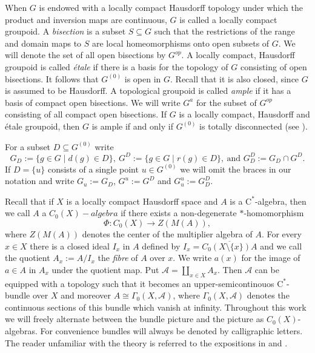 \documentclass[reqno,oneside,a4paper,11pt]{amsart}
\theoremstyle{theorem}
\theoremstyle{definition}
\begin{document}
	When $G$ is endowed with a locally compact Hausdorff topology under which the product and inversion maps are continuous, $G$ is called a locally compact groupoid. A \textit{bisection} is a subset $S\subseteq G$ such that the restrictions of the range and domain maps to $S$ are local homeomorphisms onto open subsets of $G$. We will denote the set of all open bisections by $G^{op}$. A locally compact, Hausdorff groupoid is called \textit{étale} if there is a basis for the topology of $G$ consisting of open bisections. It follows that $G^{(0)}$ is open in $G$. Recall that it is also closed, since $G$ is assumed to be Hausdorff. A topological groupoid is called \emph{ample} if it has a basis of compact open bisections. We will write $G^a$ for the subset of $G^{op}$ consisting of all compact open bisections. If $G$ is a locally compact, Hausdorff and étale groupoid, then $G$ is ample if and only if $G^{(0)}$ is totally disconnected (see \cite[Proposition 4.1]{Exel10}).
	
	For a subset $D\subseteq G^{(0)}$ write
	$$G_D:=\lbrace g\in G\mid d(g)\in D\rbrace,\ G^D:=\lbrace g\in G\mid r(g)\in D\rbrace,\ \text{and } G_D^D:=G_D\cap G^D.$$
	If $D=\lbrace u\rbrace$ consists of a single point $u\in G^{(0)}$ we will omit the braces in our notation and write $G_u:=G_D$, $G^u:=G^D$ and $G_u^u:=G_D^D$.
	
	Recall that if $X$ is a locally compact Hausdorff space and $A$ is a $\mathrm{C}^*$-algebra, then we call $A$ a $C_0(X)-algebra$ if there exists a non-degenerate $\ast$-homomorphism
	$$\Phi:C_0(X)\rightarrow Z(M(A)),$$ where $Z(M(A))$ denotes the center of the multiplier algebra of $A$. For every $x\in X$ there is a closed ideal $I_x$ in $A$ defined by $I_x=\overline{C_0(X\setminus\lbrace x\rbrace)A}$ and we call the quotient $A_x:=A/I_x$ the \textit{fibre} of $A$ over $x$. We write $a(x)$ for the image of $a\in A$ in $A_x$ under the quotient map. Put $\mathcal{A}=\coprod_{x\in X} A_x$. Then $\mathcal{A}$ can be equipped with a topology such that it becomes an upper-semicontinouos $\mathrm{C}^*$-bundle over $X$ and moreover $A\cong \Gamma_0(X,\mathcal{A})$, where $\Gamma_0(X,\mathcal{A})$ denotes the continuous sections of this bundle which vanish at infinity.
	Throughout this work we will freely alternate between the bundle picture and the picture as $C_0(X)$-algebras. For convenience bundles will always be denoted by calligraphic letters.
	The reader unfamiliar with the theory is referred to the expositions in \cite[Appendix C]{Williams} and \cite[Section~3.1]{Goehle}.
	
\end{document}

